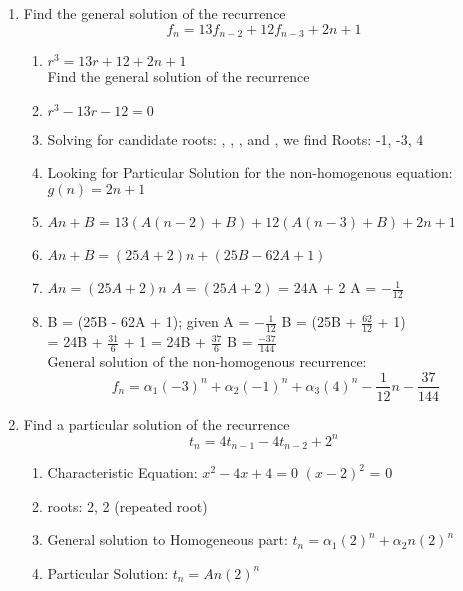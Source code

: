 \documentclass[11pt]{article}
\newcounter{prnum}
\newenvironment{problem}{{\vskip 0.2in\noindent\bf Problem
       \addtocounter{prnum}{1} \arabic{prnum}.}}{\vskip 0.1in}
\begin{document}

\begin{problem} 
\begin{enumerate}[label=\alph*)]
  \item  Find the general solution of the recurrence
    \begin{equation*}
      f_n = 13f_{n-2} + 12f_{n-3} + 2n + 1
    \end{equation*}
    \begin{enumerate}
      \item $r^3 = 13r + 12 + 2n + 1$\\

        Find the general solution of the recurrence
      \item $r^3 - 13r - 12 = 0$
      \item Solving for candidate roots: , , , and ,
        we find Roots: -1, -3, 4
      \item Looking for Particular Solution for the non-homogenous equation: $g(n) = 2n + 1$
      \item $An + B$ = $13(A(n-2) + B) + 12(A(n-3) + B) + 2n + 1$
      \item $An + B = (25A + 2)n + (25B - 62A + 1)$
      \item \Rightarrow $An = (25A + 2)n$ \Rightarrow $A = (25A + 2)$  = 24A + 2
       \Rightarrow A = $-\frac{1}{12}$
      \item \Rightarrow B = (25B - 62A + 1); given A = $-\frac{1}{12}$ \Rightarrow B = (25B + $\frac{62}{12}$ + 1)  \\

         = 24B + $\frac{31}{6}$ + 1  = 24B + $\frac{37}{6}$ \Rightarrow B = $\frac{-37}{144}$\\

        General solution of the non-homogenous recurrence:
        \begin{equation}
          f_n = \alpha_1(-3)^n + \alpha_2(-1)^n + \alpha_3(4)^n - \frac{1}{12}n - \frac{37}{144}
        \end{equation}

    \end{enumerate}

  \item Find a particular solution of the recurrence
    \begin{equation*}
      t_n = 4t_{n-1} - 4t_{n-2} + 2^{n}
    \end{equation*}
    \begin{enumerate}
      \item Characteristic Equation: $x^2 - 4x +4 = 0$ \Rightarrow $(x-2)^2$ = 0
      \item roots: 2, 2 (repeated root)
      \item General solution to Homogeneous part: $t_n = \alpha_1(2)^n + \alpha_2n(2)^n$
      \item Particular Solution: $t_n = An(2)^n$\\


\end{enumerate}
\end{enumerate}
\end{problem}
\end{document}
